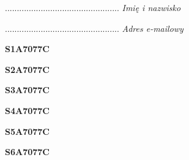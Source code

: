 \begin{turn}{90}\begin{minipage}{\linewidth} \vspace{20mm} ................................................  \textit{Imię i nazwisko}\end{minipage}\end{turn}

\begin{turn}{90}\begin{minipage}{\linewidth} \vspace{20mm} ................................................  \textit{Adres e-mailowy}\end{minipage}\end{turn}

\begin{turn}{90}\huge \begin{minipage}{\linewidth} \vspace{10mm}\textbf{S1A7077C}\end{minipage}\end{turn}

\begin{turn}{90}\huge \begin{minipage}{\linewidth} \vspace{10mm}\textbf{S2A7077C}\end{minipage}\end{turn}

\begin{turn}{90}\huge \begin{minipage}{\linewidth} \vspace{10mm}\textbf{S3A7077C}\end{minipage}\end{turn}

\begin{turn}{90}\huge \begin{minipage}{\linewidth} \vspace{10mm}\textbf{S4A7077C}\end{minipage}\end{turn}

\begin{turn}{90}\huge \begin{minipage}{\linewidth} \vspace{10mm}\textbf{S5A7077C}\end{minipage}\end{turn}

\begin{turn}{90}\huge \begin{minipage}{\linewidth} \vspace{10mm}\textbf{S6A7077C}\end{minipage}\end{turn}


